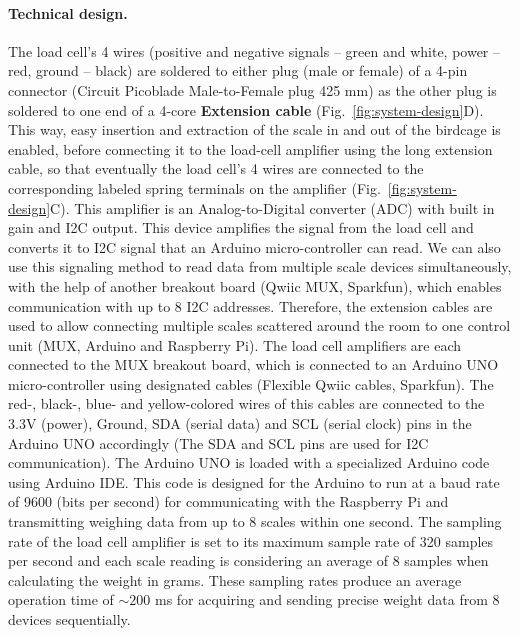 \documentclass{article}
\begin{document}
\paragraph{Technical design.} The load cell’s 4 wires (positive and negative signals – green and white, power – red, ground – black) are soldered to either plug (male or female) of a 4-pin connector (Circuit Picoblade Male-to-Female plug 425 mm) as the other plug is soldered to one end of a 4-core \textbf{Extension cable} (Fig.~\ref{fig:system-design}D). This way, easy insertion and extraction of the scale in and out of the birdcage is enabled, before connecting it to the load-cell amplifier using the long extension cable, so that eventually the load cell’s 4 wires are connected to the corresponding labeled spring terminals on the amplifier (Fig.~\ref{fig:system-design}C). This amplifier is an Analog-to-Digital converter (ADC) with built in gain and I2C output. This device amplifies the signal from the load cell and converts it to I2C signal that an Arduino micro-controller can read. We can also use this signaling method to read data from multiple scale devices simultaneously, with the help of another breakout board (Qwiic MUX, Sparkfun), which enables communication with up to 8 I2C addresses. Therefore, the extension cables are used to allow connecting multiple scales scattered around the room to one control unit (MUX, Arduino and Raspberry Pi). The load cell amplifiers are each connected to the MUX breakout board, which is connected to an Arduino UNO micro-controller using designated cables (Flexible Qwiic cables, Sparkfun). The red-, black-, blue- and yellow-colored wires of this cables are connected to the 3.3V (power), Ground, SDA (serial data) and SCL (serial clock) pins in the Arduino UNO accordingly (The SDA and SCL pins are used for I2C communication). The Arduino UNO is loaded with a specialized Arduino code using Arduino IDE. This code is designed for the Arduino to run at a baud rate of 9600 (bits per second) for communicating with the Raspberry Pi and transmitting weighing data from up to 8 scales within one second. The sampling rate of the load cell amplifier is set to its maximum sample rate of 320 samples per second and each scale reading is considering an average of 8 samples when calculating the weight in grams. These sampling rates produce an average operation time of $ \sim 200$ ms for acquiring and sending precise weight data from 8 devices sequentially.
\end{document}
